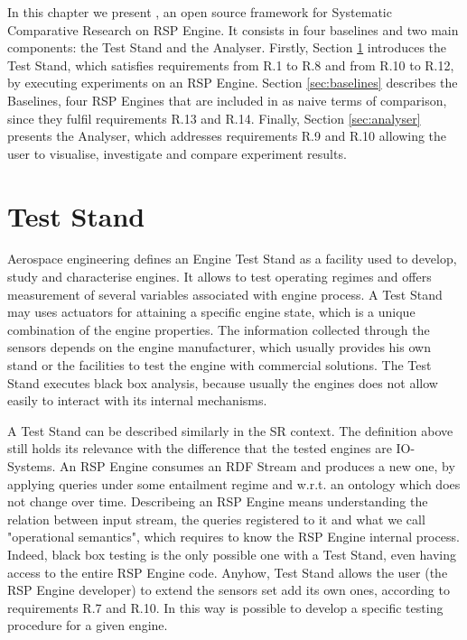 In this chapter we present  \namens,  an open source framework for Systematic Comparative Research on RSP Engine.
It consists in four baselines and two main components: the Test Stand and the Analyser. Firstly, Section \ref{sec:teststand} introduces the Test Stand, which satisfies requirements from R.1 to R.8 and from R.10 to R.12, by executing experiments on an RSP Engine. Section \ref{sec:baselines} describes the Baselines, four RSP Engines that are included in \name as naive terms of comparison, since they fulfil requirements R.13 and R.14. Finally, Section \ref{sec:analyser} presents the Analyser, which addresses requirements R.9 and R.10  allowing the user to visualise, investigate and compare experiment results. %

\section{Test Stand}\label{sec:teststand}

Aerospace engineering defines an Engine Test Stand as a facility used to develop, study and characterise engines. It allows to test operating regimes and offers measurement of several variables associated with engine process. A Test Stand may uses actuators for attaining a specific engine state, which is a unique combination of the engine properties. The information collected through the sensors depends on the engine manufacturer, which usually provides his own stand or the facilities to test the engine with commercial solutions. The Test Stand executes black box analysis, because usually the engines does not allow easily to interact with its internal mechanisms.

A Test Stand can be described similarly in the SR context. The definition above still holds its relevance with the difference that the tested engines are IO-Systems. An RSP Engine consumes an RDF Stream and  produces a new one, by applying queries under some entailment regime and w.r.t. an ontology which does not change over time. Describeing an RSP Engine means understanding the relation between input stream, the queries registered to it and what we call "operational semantics", which requires to know the RSP Engine internal process. Indeed, black box testing is the only possible one with a Test Stand, even having access to the entire RSP Engine code. Anyhow, \name Test Stand allows the user (the RSP Engine developer) to extend the sensors set add its own ones, according to requirements R.7 and R.10. In this way is possible to develop a specific testing procedure for a given engine.

